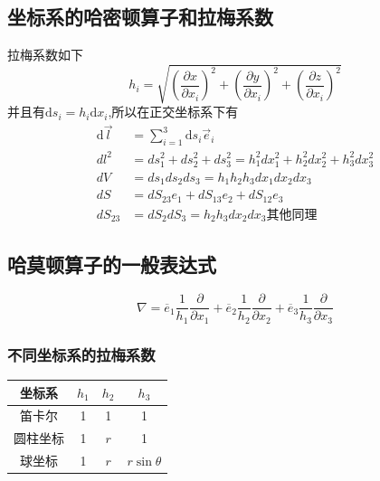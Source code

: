 \documentclass[twocolumn]{ctexart}
\begin{document}
\subsection{坐标系的哈密顿算子和拉梅系数}
拉梅系数如下
\begin{equation}
  h_{i}= \sqrt{(\frac{\partial x}{\partial x_{i}})^{2}+(\frac{\partial y}{\partial x_{i}})^{2}+(\frac{\partial z}{\partial x_{i}})^{2}}\tag{1.7}
\end{equation}
并且有$\mathrm{d}{s_i}=h_i \mathrm{d}{x_i}$,所以在正交坐标系下有
\begin{align}
\mathrm{d}{\vec{l}}&=\sum_{i=1}^{3}\mathrm{d}{s_i}\vec{e}_i \tag{1.8.a} \\
d l ^ { 2 } &= d s _ { 1 } ^ { 2 } + d s _ { 2 } ^ { 2 } + d s _ { 3 } ^ { 2 } = h _ { 1 } ^ { 2 } d x _ { 1 } ^ { 2 } + h _ { 2 } ^ { 2 } d x _ { 2 } ^ { 2 } + h _ { 3 } ^ { 2 } d x _ { 3 } ^ { 2 }
\tag{1.8.b}\\
d V &= d s _ { 1 } d s _ { 2 } d s _ { 3 } = h _ { 1 } h _ { 2 } h _ { 3 } d x _ { 1 } d x _ { 2 } d x _ { 3 } 
\tag{1.8.c} \\
d S &= d S _ { 23 } e _ { 1 } + d S _ { 13 } e _ { 2 } + d S _ { 12 } e _ { 3 }
\tag{1.8.d} \\
d S _ { 23 }&=dS_{2}dS_{3}=h_2h_3dx_2dx_3 \text{其他同理}\tag{1.8.e} 
\end{align}
\subsection{哈莫顿算子的一般表达式}
$$ \nabla= \overline{e}_{1}\frac{1}{h_{1}}\frac{\partial}{\partial x_{1}}+ \overline{e}_{2}\frac{1}{h_{2}}\frac{\partial}{\partial x_{2}}+ \overline{e}_{3}\frac{1}{h_{3}}\frac{\partial}{\partial x_{3}} $$
\subsubsection{不同坐标系的拉梅系数}
% 
\begin{table}[H]
  \centering
  \begin{tabular}{cccc}
 \\ \hline
  坐标系&$h_1$&$h_2$&$h_3$ \\
   \hline
   笛卡尔&1&1&1 \\
   \hline
    圆柱坐标&1&$r$&1 \\
    \hline
    球坐标&1&$r$&$r\sin \theta$ \\
    \hline
\end{tabular}
\end{table}
\end{document}
